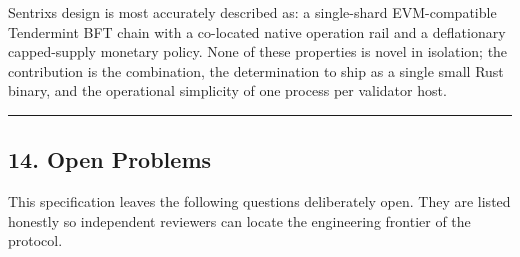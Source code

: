 \documentclass[11pt,a4paper]{article}
\begin{document}
Sentrix\textquotesingle s design is most accurately described as: a
single-shard EVM-compatible Tendermint BFT chain with a co-located
native operation rail and a deflationary capped-supply monetary policy.
None of these properties is novel in isolation; the contribution is the
combination, the determination to ship as a single small Rust binary,
and the operational simplicity of one process per validator host.

\begin{center}\rule{0.5\linewidth}{0.5pt}\end{center}

\hypertarget{14-open-problems}{%
\subsection{14. Open Problems}\label{14-open-problems}}

This specification leaves the following questions deliberately open.
They are listed honestly so independent reviewers can locate the
engineering frontier of the protocol.
\end{document}

